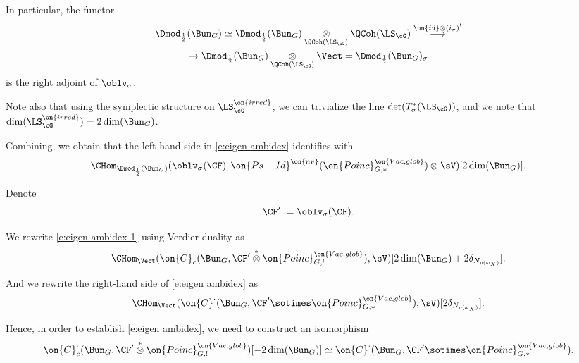 \documentclass[9pt]{amsart}
\theoremstyle{remark}
\theoremstyle{definition}
\theoremstyle{remark}
\numberwithin{equation}{section}
\begin{document}
\medskip

In particular, the functor
\begin{multline*} 
\Dmod_{\frac{1}{2}}(\Bun_G)\simeq \Dmod_{\frac{1}{2}}(\Bun_G)\underset{\QCoh(\LS_\cG)}\otimes 
\QCoh(\LS_\cG) \overset{\on{id}\otimes (i_\sigma)^!}\longrightarrow \\
\to \Dmod_{\frac{1}{2}}(\Bun_G)\underset{\QCoh(\LS_\cG)}\otimes \Vect=
\Dmod_{\frac{1}{2}}(\Bun_G)_\sigma
\end{multline*}
is the right adjoint of $\oblv_\sigma$.

\medskip

Note also that using the symplectic structure on $\LS^{\on{irred}}_\cG$, we can trivialize the line $\det(T^*_\sigma(\LS_\cG))$,
and we note that $\dim(\LS^{\on{irred}}_\cG)=2\dim(\Bun_G)$. 

\medskip

Combining, we obtain that the left-hand side in \eqref{e:eigen ambidex} identifies with
\begin{equation} \label{e:eigen ambidex 1}
\CHom_{\Dmod_{\frac{1}{2}}(\Bun_G)}(\oblv_\sigma(\CF),\on{Ps-Id}^{\on{nv}}(\on{Poinc}^{\on{Vac,glob}}_{G,*})\otimes \sV)[2\dim(\Bun_G)].
\end{equation}

\sssec{}

Denote 
$$\CF':=\oblv_\sigma(\CF).$$

We rewrite \eqref{e:eigen ambidex 1} using Verdier duality as
\begin{equation} \label{e:eigen ambidex 2}
\CHom_{\Vect}(\on{C}^\cdot_c(\Bun_G,\CF'\overset{*}\otimes \on{Poinc}^{\on{Vac,glob}}_{G,!}),\sV)[2\dim(\Bun_G)+2\delta_{N_{\rho(\omega_X)}}].
\end{equation}

And we rewrite the right-hand side of \eqref{e:eigen ambidex} as
\begin{equation} \label{e:eigen ambidex 3}
\CHom_{\Vect}(\on{C}^\cdot(\Bun_G,\CF'\sotimes \on{Poinc}^{\on{Vac,glob}}_{G,*}),\sV)[2\delta_{N_{\rho(\omega_X)}}].
\end{equation}

Hence, in order to establish \eqref{e:eigen ambidex}, we need to construct an isomorphism
\begin{equation} \label{e:eigen ambidex 4}
\on{C}^\cdot_c(\Bun_G,\CF'\overset{*}\otimes \on{Poinc}^{\on{Vac,glob}}_{G,!})[-2\dim(\Bun_G)] \simeq 
\on{C}^\cdot(\Bun_G,\CF'\sotimes \on{Poinc}^{\on{Vac,glob}}_{G,*}).
\end{equation}
\end{document}
